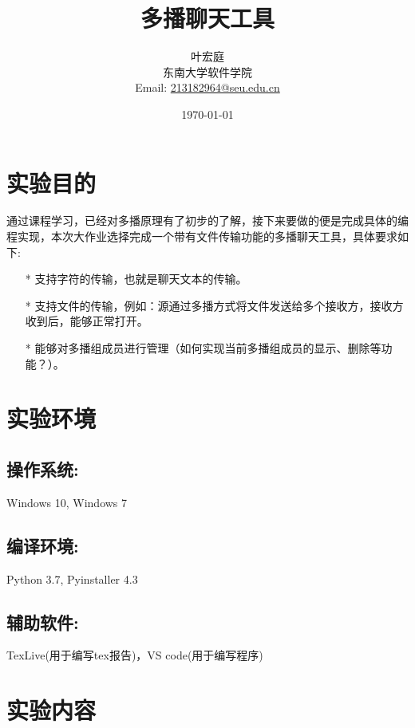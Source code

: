 \documentclass[UTF8]{ctexart}
\author{\small{\kaishu 71118415 叶宏庭}\\[2pt]
\small{\kaishu 东南大学软件学院}\\[2pt]
\small{Email:}
\url{213182964@seu.edu.cn}
}
\title{\Huge{\heiti 多播聊天工具}}
\date{\today} %
\begin{document}
\maketitle

\section{实验目的}{通过课程学习，已经对多播原理有了初步的了解，接下来要做的便是完成具体的编程实现，本次大作业选择完成一个带有文件传输功能的多播聊天工具，具体要求如下: }
\par{
	\begin{itemize}
		\item[*] 支持字符的传输，也就是聊天文本的传输。
		\item[*] 支持文件的传输，例如：源通过多播方式将文件发送给多个接收方，接收方收到后，能够正常打开。
		\item[*] 能够对多播组成员进行管理（如何实现当前多播组成员的显示、删除等功能？）。
	\end{itemize}
}

\section{实验环境}
\subsection{操作系统:}{Windows 10, Windows 7}
\subsection{编译环境:}{Python 3.7, Pyinstaller 4.3}
\subsection{辅助软件:}{TexLive(用于编写tex报告)，VS code(用于编写程序)}
\section{实验内容}
\end{document}
